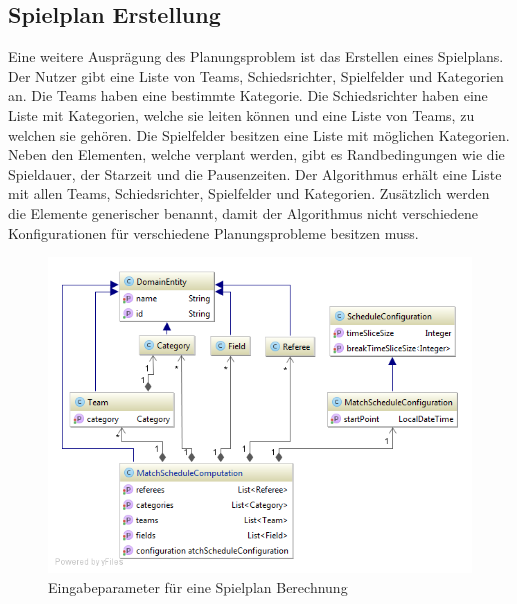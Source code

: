 %
%
%
%

\subsection{Spielplan Erstellung}
Eine weitere Ausprägung des Planungsproblem ist das Erstellen eines Spielplans. Der Nutzer gibt eine Liste von Teams, Schiedsrichter, Spielfelder und Kategorien an. Die Teams haben eine 
bestimmte Kategorie. Die Schiedsrichter haben eine Liste mit Kategorien, welche sie leiten können und eine Liste von Teams, zu welchen sie gehören. Die Spielfelder besitzen eine Liste mit 
möglichen Kategorien. Neben den Elementen, welche verplant werden, gibt es Randbedingungen wie die Spieldauer, der Starzeit und die Pausenzeiten. Der Algorithmus erhält eine 
Liste mit allen Teams, Schiedsrichter, Spielfelder und Kategorien. Zusätzlich werden die Elemente generischer benannt, damit der Algorithmus nicht verschiedene Konfigurationen für 
verschiedene Planungsprobleme besitzen muss.

\begin{figure}[h]
\centering
\includegraphics[scale=0.5]{images/probleme/matchSchedule.png}
\caption[Eingabeparameter für eine Spielplan Berechnung]{Eingabeparameter für eine Spielplan Berechnung \selfmade{}}
\label{fig:matchschedule_input}
\end{figure}

